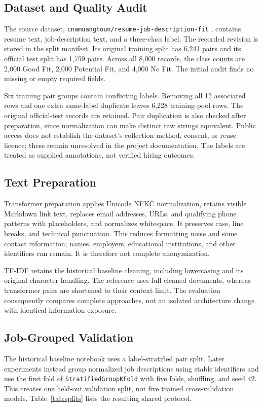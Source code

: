 \documentclass[conference,a4paper]{IEEEtran}
\newcommand{\GF}{Good Fit}
\newcommand{\PF}{Potential Fit}
\newcommand{\NF}{No Fit}
\begin{document}
\subsection{Dataset and Quality Audit}
The source dataset, \nolinkurl{cnamuangtoun/resume-job-description-fit} \cite{dataset}, contains resume text, job-description text, and a three-class label. The recorded revision is stored in the split manifest. Its original training split has 6,241 pairs and its official test split has 1,759 pairs. Across all 8,000 records, the class counts are 2,000 \GF, 2,000 \PF, and 4,000 \NF. The initial audit finds no missing or empty required fields.

Six training pair groups contain conflicting labels. Removing all 12 associated rows and one extra same-label duplicate leaves 6,228 training-pool rows. The original official-test records are retained. Pair duplication is also checked after preparation, since normalization can make distinct raw strings equivalent. Public access does not establish the dataset's collection method, consent, or reuse licence; these remain unresolved in the project documentation. The labels are treated as supplied annotations, not verified hiring outcomes.

\subsection{Text Preparation}
Transformer preparation applies Unicode NFKC normalization, retains visible Markdown link text, replaces email addresses, URLs, and qualifying phone patterns with placeholders, and normalizes whitespace. It preserves case, line breaks, and technical punctuation. This reduces formatting noise and some contact information; names, employers, educational institutions, and other identifiers can remain. It is therefore not complete anonymization.

TF-IDF retains the historical baseline cleaning, including lowercasing and its original character handling. The reference uses full cleaned documents, whereas transformer pairs are shortened to their context limit. The evaluation consequently compares complete approaches, not an isolated architecture change with identical information exposure.

\subsection{Job-Grouped Validation}
The historical baseline notebook uses a label-stratified pair split. Later experiments instead group normalized job descriptions using stable identifiers and use the first fold of \texttt{StratifiedGroupKFold} with five folds, shuffling, and seed 42. This creates one held-out validation split, not five trained cross-validation models. Table~\ref{tab:splits} lists the resulting shared protocol.
\end{document}

